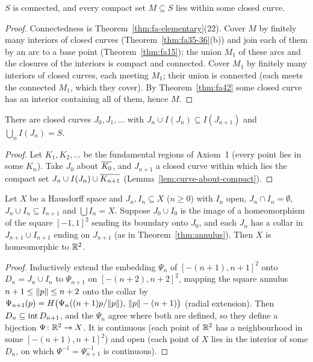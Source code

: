 \begin{lemma}\label{lem:curve-about-compact}
$S$ is connected, and every compact set $M\subseteq S$ lies within some closed curve.
\end{lemma}

\begin{proof}
Connectedness is Theorem~\ref{thm:fa-elementary}(22). Cover $M$ by finitely many interiors of closed curves (Theorem~\ref{thm:fa35-36}(b))
and join each of them by an arc to a base point (Theorem~\ref{thm:fa15}); the union $M_1$ of these arcs and the closures of the interiors
is compact and connected. Cover $M_1$ by finitely many interiors of closed curves, each meeting $M_1$; their union is connected (each meets
the connected $M_1$, which they cover). By Theorem~\ref{thm:fa42} some closed curve has an interior containing all of them, hence $M$.
\end{proof}


\begin{theorem}\label{thm:theoremF}
There are closed curves $J_0,J_1,\dots$ with $J_n\cup I(J_n)\subseteq I(J_{n+1})$ and $\bigcup_nI(J_n)=S$.
\end{theorem}

\begin{proof}
Let $K_1,K_2,\dots$ be the fundamental regions of Axiom~1 (every point lies in some $K_n$). Take $J_0$ about $\overline{K_0}$, and $J_{n+1}$ a
closed curve within which lies the compact set $J_n\cup I(J_n)\cup\overline{K_{n+1}}$ (Lemma~\ref{lem:curve-about-compact}).
\end{proof}


\begin{proposition}[Pasting]\label{prop:paste}
Let $X$ be a Hausdorff space and $J_n,I_n\subseteq X$ ($n\ge0$) with $I_n$ open, $J_n\cap I_n=\emptyset$, $J_n\cup I_n\subseteq I_{n+1}$ and
$\bigcup I_n=X$. Suppose $J_0\cup I_0$ is the image of a homeomorphism of the square $[-1,1]^2$ sending its boundary onto $J_0$, and each
$J_n$ has a collar in $J_{n+1}\cup I_{n+1}$ ending on $J_{n+1}$ (as in Theorem~\ref{thm:annulus}). Then $X$ is homeomorphic to $\mathbb{R}^2$.
\end{proposition}

\begin{proof}
Inductively extend the embedding $\Psi_n$ of $[-(n+1),n+1]^2$ onto $D_n=J_n\cup I_n$ to $\Psi_{n+1}$ on $[-(n+2),n+2]^2$, mapping the square
annulus $n+1\le\lVert p\rVert\le n+2$ onto the collar by $\Psi_{n+1}(p)=H\big(\Psi_n((n+1)p/\lVert p\rVert),\,\lVert p\rVert-(n+1)\big)$ (radial extension). Then
$D_n\subseteq\operatorname{int} D_{n+1}$, and the $\Psi_n$ agree where both are defined, so they define a bijection $\Psi\colon\mathbb{R}^2\to X$. It is
continuous (each point of $\mathbb{R}^2$ has a neighbourhood in some $[-(n+1),n+1]^2$) and open (each point of $X$ lies in the interior of some
$D_n$, on which $\Psi^{-1}=\Psi_{n+1}^{-1}$ is continuous).
\end{proof}

